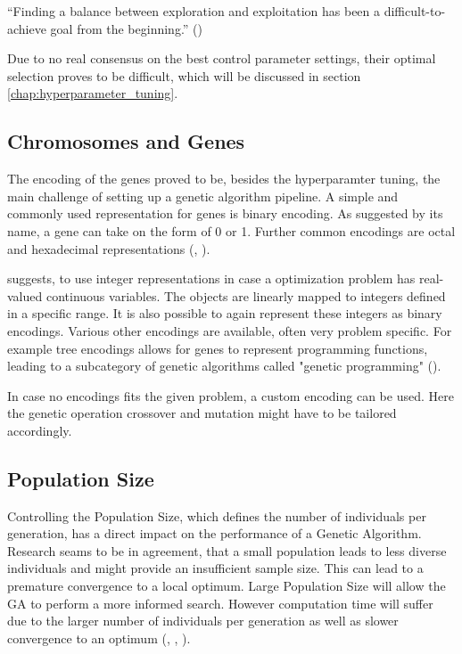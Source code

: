 \enquote{Finding a balance between exploration and exploitation has been a difficult-to-achieve goal from the beginning.} (\cite{kacprzyk_parameter_2007})

Due to no real consensus on the best control parameter settings, their optimal selection proves to be difficult, which will be discussed in section \ref{chap:hyperparameter_tuning}.

\subsection{Chromosomes and Genes}
\label{chap:foundation:ga:encoding}


The encoding of the genes proved to be, besides the hyperparamter tuning, the main challenge of setting up a genetic algorithm pipeline.
A simple and commonly used representation for genes is binary encoding. As suggested by its name, a gene can take on the form of 0 or 1. Further common encodings are octal and hexadecimal representations (\cite{srinivas_genetic_1994}, \cite{katoch_review_2021}).

\cite{srinivas_genetic_1994} suggests, to use integer representations in case a optimization problem has real-valued continuous variables. The objects are linearly mapped to integers defined in a specific range. It is also possible to again represent these integers as binary encodings. Various other encodings are available, often very problem specific. For example tree encodings allows for genes to represent programming functions, leading to a subcategory of genetic algorithms called "genetic programming" (\cite{katoch_review_2021}).

In case no encodings fits the given problem, a custom encoding can be used. Here the genetic operation crossover and mutation might have to be tailored accordingly. 


\subsection{Population Size}
Controlling the Population Size, which defines the number of individuals per generation, has a direct impact on the performance of a Genetic Algorithm.
Research seams to be in agreement, that a small population leads to less diverse individuals and might provide an insufficient sample size. This can lead to a premature convergence to a local optimum.
Large Population Size will allow the GA to perform a more informed search. However computation time will suffer due to the larger number of individuals per generation as well as slower convergence to an optimum (\cite{grefenstette_optimization_1986}, \cite{katoch_review_2021}, \cite{kacprzyk_parameter_2007}).

